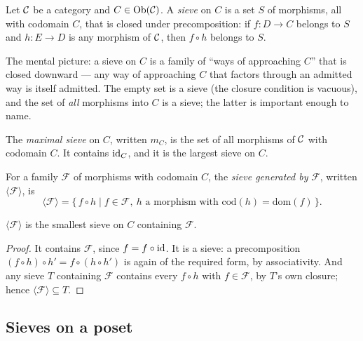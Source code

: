 \begin{definition}[Sieve]\label{ch03:def:sieve}
Let $\mathcal{C}$ be a category and $C \in \mathrm{Ob}(\mathcal{C})$. A \emph{sieve} on $C$ is
a set $S$ of morphisms, all with codomain $C$, that is closed under
precomposition: if $f : D \to C$ belongs to $S$ and $h : E \to D$ is
any morphism of $\mathcal{C}$, then $f \circ h$ belongs to $S$.
\end{definition}

The mental picture: a sieve on $C$ is a family of ``ways of approaching
$C$'' that is closed downward --- any way of approaching $C$ that
factors through an admitted way is itself admitted. The empty set is a
sieve (the closure condition is vacuous), and the set of \emph{all}
morphisms into $C$ is a sieve; the latter is important enough to name.

\begin{definition}\label{ch03:def:maximal}
The \emph{maximal sieve} on $C$, written $m_C$, is the set of all
morphisms of $\mathcal{C}$ with codomain $C$. It contains $\mathrm{id}_C$, and it is
the largest sieve on $C$.
\end{definition}

\begin{definition}\label{ch03:def:generated}
For a family $\mathcal{F}$ of morphisms with codomain $C$, the
\emph{sieve generated by} $\mathcal{F}$, written
$\langle \mathcal{F} \rangle$, is
\[
\langle \mathcal{F} \rangle
= \{\, f \circ h \mid f \in \mathcal{F},\ h \text{ a morphism with }
\mathrm{cod}(h) = \mathrm{dom}(f) \,\}.
\]
\end{definition}

\begin{proposition}\label{ch03:prop:generated}
$\langle \mathcal{F} \rangle$ is the smallest sieve on $C$ containing
$\mathcal{F}$.
\end{proposition}

\begin{proof}
It contains $\mathcal{F}$, since $f = f \circ \mathrm{id}$. It is a sieve: a
precomposition $(f \circ h) \circ h' = f \circ (h \circ h')$ is again
of the required form, by associativity. And any sieve $T$ containing
$\mathcal{F}$ contains every $f \circ h$ with $f \in \mathcal{F}$, by
$T$'s own closure; hence $\langle \mathcal{F} \rangle \subseteq T$.
\end{proof}

\subsection{Sieves on a poset}\label{ch03:sec:sieve-poset}

